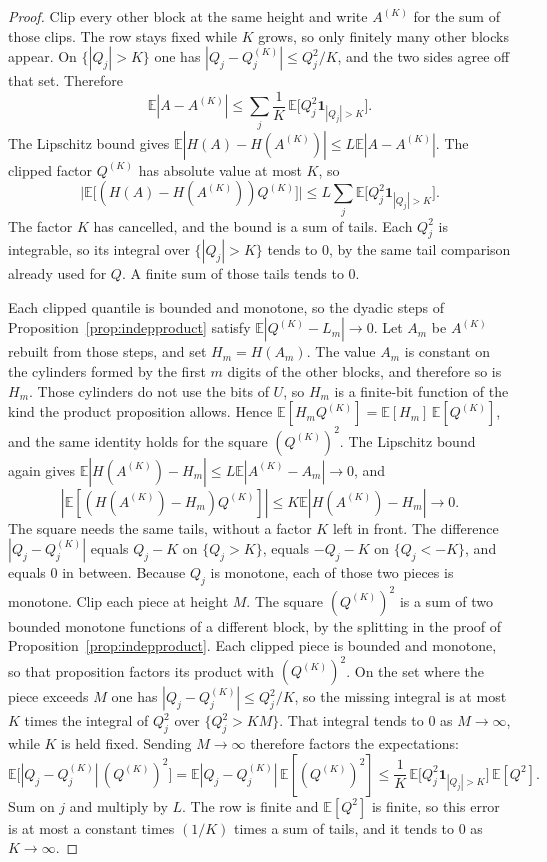 \begin{proof}
Clip every other block at the same height and write $A^{(K)}$ for the sum of those clips. The row stays fixed while $K$ grows, so only finitely many other blocks appear. On $\{|Q_j|>K\}$ one has $|Q_j-Q_j^{(K)}|\le Q_j^2/K$, and the two sides agree off that set. Therefore
\[
 \mathbb E|A-A^{(K)}|\le\sum_j\frac1K\,\mathbb E\bigl[Q_j^2\mathbf 1_{|Q_j|>K}\bigr].
\]
The Lipschitz bound gives $\mathbb E|H(A)-H(A^{(K)})|\le L\mathbb E|A-A^{(K)}|$. The clipped factor $Q^{(K)}$ has absolute value at most $K$, so
\[
 \bigl|\mathbb E\bigl[(H(A)-H(A^{(K)}))Q^{(K)}\bigr]\bigr|
 \le L\sum_j\mathbb E\bigl[Q_j^2\mathbf 1_{|Q_j|>K}\bigr].
\]
The factor $K$ has cancelled, and the bound is a sum of tails. Each $Q_j^2$ is integrable, so its integral over $\{|Q_j|>K\}$ tends to $0$, by the same tail comparison already used for $Q$. A finite sum of those tails tends to $0$.

Each clipped quantile is bounded and monotone, so the dyadic steps of Proposition~\ref{prop:indepproduct} satisfy $\mathbb E|Q^{(K)}-L_m|\to0$. Let $A_m$ be $A^{(K)}$ rebuilt from those steps, and set $H_m=H(A_m)$. The value $A_m$ is constant on the cylinders formed by the first $m$ digits of the other blocks, and therefore so is $H_m$. Those cylinders do not use the bits of $U$, so $H_m$ is a finite-bit function of the kind the product proposition allows. Hence $\mathbb E[H_m Q^{(K)}]=\mathbb E[H_m]\,\mathbb E[Q^{(K)}]$, and the same identity holds for the square $(Q^{(K)})^2$. The Lipschitz bound again gives $\mathbb E|H(A^{(K)})-H_m|\le L\mathbb E|A^{(K)}-A_m|\to0$, and
\[
 |\mathbb E[(H(A^{(K)})-H_m)Q^{(K)}]|\le K\mathbb E|H(A^{(K)})-H_m|\to0.
\]
The square needs the same tails, without a factor $K$ left in front. The difference $|Q_j-Q_j^{(K)}|$ equals $Q_j-K$ on $\{Q_j>K\}$, equals $-Q_j-K$ on $\{Q_j<-K\}$, and equals $0$ in between. Because $Q_j$ is monotone, each of those two pieces is monotone. Clip each piece at height $M$. The square $(Q^{(K)})^2$ is a sum of two bounded monotone functions of a different block, by the splitting in the proof of Proposition~\ref{prop:indepproduct}. Each clipped piece is bounded and monotone, so that proposition factors its product with $(Q^{(K)})^2$. On the set where the piece exceeds $M$ one has $|Q_j-Q_j^{(K)}|\le Q_j^2/K$, so the missing integral is at most $K$ times the integral of $Q_j^2$ over $\{Q_j^2>KM\}$. That integral tends to $0$ as $M\to\infty$, while $K$ is held fixed. Sending $M\to\infty$ therefore factors the expectations:
\[
 \mathbb E\bigl[|Q_j-Q_j^{(K)}|\,(Q^{(K)})^2\bigr]
 =\mathbb E|Q_j-Q_j^{(K)}|\,\mathbb E[(Q^{(K)})^2]
 \le\frac1K\,\mathbb E\bigl[Q_j^2\mathbf 1_{|Q_j|>K}\bigr]\,\mathbb E[Q^2].
\]
Sum on $j$ and multiply by $L$. The row is finite and $\mathbb E[Q^2]$ is finite, so this error is at most a constant times $(1/K)$ times a sum of tails, and it tends to $0$ as $K\to\infty$.


\end{proof}
